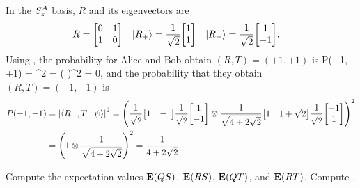 \begin{solution}
	In the $S_z^A$ basis, $R$ and its eigenvectors are
	\begin{align*}
		R &= \mqty[ 0 & 1 \\ 1 & 0 ] &
		\kRp &= \frac{1}{\sqrt{2}} \mqty[ 1 \\ 1 ] &
		\kRm &= \frac{1}{\sqrt{2}} \mqty[ 1 \\ -1 ].
	\end{align*}
	Using , the probability for Alice and Bob obtain $(R,T) = (+1, +1)$ is
	\beq
		P(+1, +1) = ^2
		= \left(  \mqty[ 1 & 1 ]  \mqty[ 1 \\ -1 ] \otimes {} \mqty[ 1 & 1 - \sqrt{2} ]  \mqty[ -1 \\ 1 ] \right)^2
		= 0,
	\eeq
	and the probability that they obtain $(R,T) = (-1, -1)$ is
		\begin{align*}
		P(-1, -1) &= \abs{\braket{R_-, T_-}{\psi}}^2
		= \left( \frac{1}{\sqrt{2}} \mqty[ 1 & -1 ] \frac{1}{\sqrt{2}} \mqty[ 1 \\ -1 ] \otimes \frac{1}{\sqrt{4 + 2 \sqrt{2}}} \mqty[ 1 & 1 + \sqrt{2} ] \frac{1}{\sqrt{2}} \mqty[ -1 \\ 1 ] \right)^2 \\
		&= \left( 1 \otimes \frac{1}{\sqrt{4 + 2 \sqrt{2}}} \right)^2
		= \frac{1}{4 + 2 \sqrt{2}}.
	\end{align*}
	\vfix
\end{solution}



\begin{problem}
	Compute the expectation values $\vb{E}(QS)$, $\vb{E}(RS)$, $\vb{E}(QT)$, and $\vb{E}(RT)$.  Compute
	\beq
		.
	\eeq
	\vfix
\end{problem}

